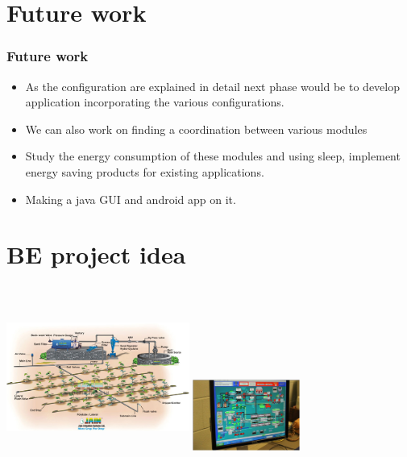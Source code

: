 \documentclass[table,10pt,blue]{beamer}	%
\begin{document}
{
\section{Future work} %
\begin{frame}
	\frametitle{Future work} 
	\begin{itemize} \color{blue}
		\item As the configuration are explained in detail next phase would be to develop application incorporating the various configurations.
		\item We can also work on finding a coordination between various modules
		\item Study the energy consumption of these modules and using sleep, implement energy saving products for existing applications.
		\item Making a java GUI and android app on it.
	\end{itemize}
\color{black}
\end{frame}
}


\section{BE project idea}
\begin{frame}
\includegraphics[width=6cm,height=6cm,keepaspectratio]{beproject}
\includegraphics[width=3.5cm,height=3.5cm,keepaspectratio]{beproject2}
\end{frame}
\end{document}
